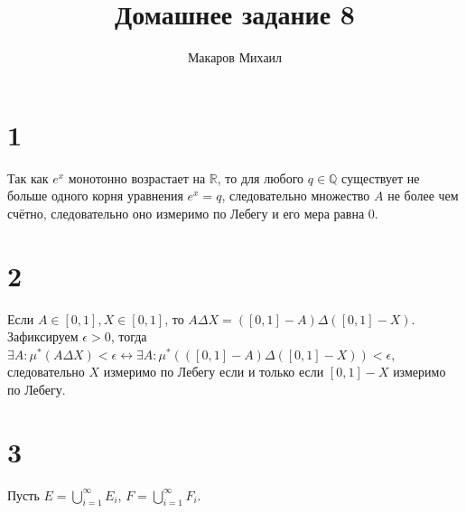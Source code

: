 \documentclass{article}
\title{Домашнее задание 8}
\author{Макаров Михаил}
\date{}
\begin{document}
	\maketitle
    \section*{1} 
    Так как $e^x$ монотонно возрастает на $\mathbb{R}$, то для любого $q \in \mathbb{Q}$ существует не больше
    одного корня уравнения $e^x = q$, следовательно множество $A$ не более чем счётно, следовательно оно измеримо 
    по Лебегу и его мера равна $0$.
    \section*{2}
    Если $A \in [0, 1], X \in [0, 1]$, то $ A \Delta X = ([0, 1] - A) \Delta ([0, 1] - X)$. \\
    Зафиксируем $\epsilon > 0$, 
    тогда $\exists A: \mu^*(A \Delta X) < \epsilon \leftrightarrow \exists A: \mu^*(([0, 1] - A) \Delta ([0, 1] - X)) < \epsilon$, следовательно $X$ измеримо по Лебегу если и только если $[0, 1] - X$ измеримо по Лебегу.
    \section*{3}
    Пусть $E = \bigcup_{i = 1}^{\infty} E_i$, $F = \bigcup_{i = 1}^{\infty} F_i$. 
\end{document}

